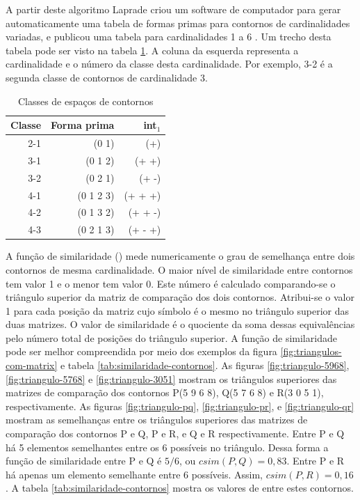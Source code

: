 A partir deste algoritmo Laprade criou um software de computador para
gerar automaticamente uma tabela de formas primas para contornos de
cardinalidades variadas, e publicou uma tabela para cardinalidades 1 a
6 \cite[p. 257]{marvin.ea87:relating}. Um trecho desta tabela pode ser
visto na tabela \ref{tab:c-space-segment-classes}. A coluna da
esquerda representa a cardinalidade e o número da classe desta
cardinalidade. Por exemplo, 3-2 é a segunda classe de contornos de
cardinalidade 3.

\begin{table}
  \centering
  \begin{tabular}{r|rr}
    Classe & Forma prima & int$_1$ \\
    \hline
    2-1 & (0 1) & (+) \\
    3-1 & (0 1 2) & (+ +) \\
    3-2 & (0 2 1) & (+ -) \\
    4-1 & (0 1 2 3) & (+ + +) \\
    4-2 & (0 1 3 2) & (+ + -) \\
    4-3 & (0 2 1 3) & (+ - +)
  \end{tabular}
  \caption{Classes de espaços de contornos}
  \label{tab:c-space-segment-classes}
\end{table}

A função de similaridade () mede numericamente o grau
de semelhança entre dois contornos de mesma cardinalidade. O maior
nível de similaridade entre contornos tem valor 1 e o menor tem valor
0. Este número é calculado comparando-se o triângulo superior da
matriz de comparação dos dois contornos. Atribui-se o valor 1 para
cada posição da matriz cujo símbolo é o mesmo no triângulo superior
das duas matrizes. O valor de similaridade é o quociente da soma
dessas equivalências pelo número total de posições do triângulo
superior. A função de similaridade pode ser melhor compreendida por
meio dos exemplos da figura \ref{fig:triangulos-com-matrix} e tabela
\ref{tab:similaridade-contornos}. As figuras \ref{fig:triangulo-5968},
\ref{fig:triangulo-5768} e \ref{fig:triangulo-3051} mostram os
triângulos superiores das matrizes de comparação dos contornos P(5 9 6
8), Q(5 7 6 8) e R(3 0 5 1), respectivamente. As figuras
\ref{fig:triangulo-pq}, \ref{fig:triangulo-pr}, e
\ref{fig:triangulo-qr} mostram as semelhanças entre os triângulos
superiores das matrizes de comparação dos contornos P e Q, P e R, e Q
e R respectivamente. Entre P e Q há 5 elementos semelhantes entre os 6
possíveis no triângulo. Dessa forma a função de similaridade entre P e
Q é $5/6$, ou $csim(P,Q)=0,83$. Entre P e R há apenas um elemento
semelhante entre 6 possíveis. Assim, $csim(P,R)=0,16$. A tabela
\ref{tab:similaridade-contornos} mostra os valores de 
entre estes contornos.

